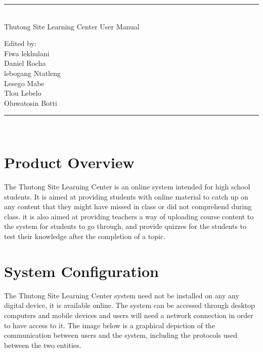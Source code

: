 \documentclass[12pt,a4paper]{article}
\begin{document}
	\begin{titlepage}
		\centering
		\vspace*{\fill}
		
		\vspace*{0.5cm}
		
		\huge\bfseries
		\rule{\textwidth}{1.6pt}\\[\baselineskip]
		Thutong Site Learning Center User Manual
		
		\vspace*{0.5cm}
		
		\large Edited by: \\[\baselineskip]
		
			{Fiwa lekhulani\\Daniel Rocha\\lebogang Ntatleng\\Lesego Mabe\\Tlou Lebelo\\Oluwatosin Botti}
		
		\rule{\textwidth}{1.6pt}\\[\baselineskip]
		
		
		\vspace*{\fill}
	\end{titlepage}

	\section{Product Overview}
		The Thutong Site Learning Center is an online system intended for high school students. It is aimed at providing students with online material to catch up on any content that they might have missed in class or did not comprehend during class. it is also aimed at providing teachers a way of uploading course content to the system for students to go through, and provide quizzes for the students to test their knowledge after the completion of a topic. 
	
	\section{System Configuration}
		The Thutong Site Learning Center system need not be installed on any any digital device, it is available online. The system can be accessed through desktop computers and mobile devices and users will need a network connection in order to have access to it. The image below is a graphical depiction of the communication between users and the system, including the protocols used between the two entities.
		
\end{document}
